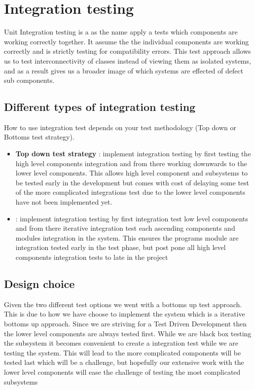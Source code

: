 \section{Integration testing}

Unit Integration testing is a as the name apply a tests which components are working correctly together. It assume the the individual components are working correctly and is strictly testing for compatibility errors. This test approach allows us to test interconnectivity of classes instead of viewing them as isolated systems, and as a result gives us a broader image of which systems are effected of defect sub components. 

\subsection{Different types of integration testing}
How to use integration test depends on your test methodology  (Top down or  Bottoms test strategy). 
\begin{itemize}
	\item \textbf{Top down test strategy} : implement integration testing by first testing the high level components integration and from there working downwards to the lower level components. This allows high level component and subsystems to be tested early in the development but comes with cost of delaying some test of the more complicated integrations test due to the lower level components have not been implemented yet.
	\item{} : implement integration testing by first integration test low level components and from there iterative integration test each ascending  components and modules integration in the system. This ensures the programs module are integration tested early in the test phase, but post pone all high level components integration tests to late in the project
\end{itemize}

\subsection{Design choice}
Given the two different test options we went with a bottoms up test approach. This is due to how we have choose to implement the system which is a iterative bottoms up approach. Since we are striving for a Test Driven Development then the lower level components are always tested first. While we are black box testing the subsystem it becomes convenient to create a integration test while we are testing the system. This will lead to the more complicated components will be tested last which will be a challenge, but hopefully our extensive work with the lower level components will ease the challenge of testing the most complicated subsystems